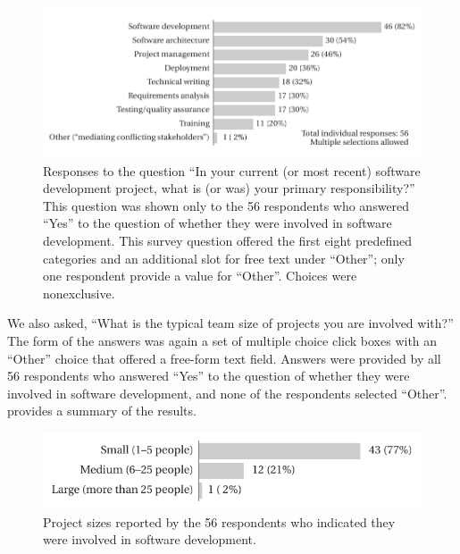 \documentclass{casicswhitepaper}
\newcommand{\totalDevelopers}{56\xspace}
\begin{document}
\begin{figure}[thb]
  \vspace*{-1ex}
  \centering
  \includegraphics{files/plots/responsibilities.pdf}
  \vspace*{-3ex}
  \caption{Responses to the question  ``In your current (or most recent) software development project, what is (or was) your primary responsibility?''  This question was shown only to the 56 respondents who answered ``Yes'' to the question of whether they were involved in software development.  This survey question offered the first eight predefined categories and an additional slot for free text under ``Other''; only one respondent provide a value for ``Other''.  Choices were nonexclusive.}
  \label{responsibilities}
\end{figure}

We also asked, ``What is the typical team size of projects you are involved with?''  The form of the answers was again a set of multiple choice click boxes with an ``Other'' choice that offered a free-form text field.  Answers were provided by all \totalDevelopers respondents who answered ``Yes'' to the question of whether they were involved in software development, and none of the respondents selected ``Other''.   provides a summary of the results.

\begin{figure}[htb]
  \vspace*{-1ex}
  \centering
  \includegraphics{files/plots/project-sizes.pdf}
  \vspace*{-3ex}
  \caption{Project sizes reported by the \totalDevelopers respondents who indicated they were involved in software development.}
  \label{project-sizes}
\end{figure}
\end{document}
